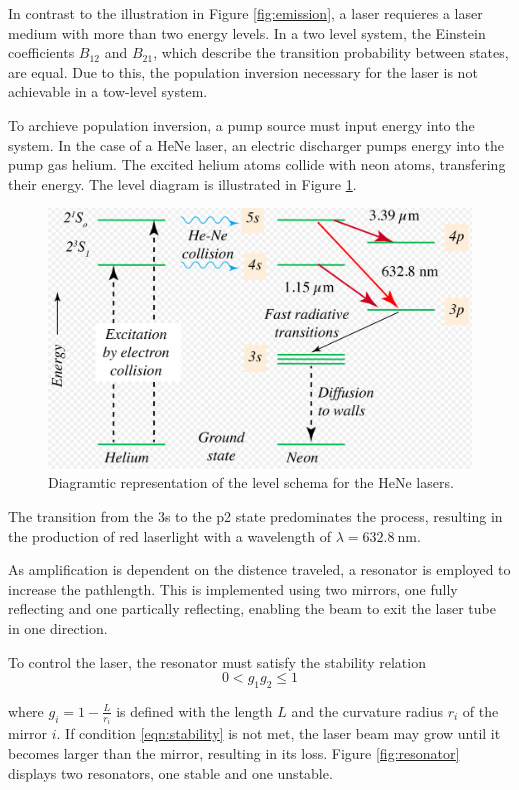 In contrast to the illustration in Figure \ref{fig:emission}, a laser 
requieres a laser medium with more than two energy levels. In a two 
level system, the Einstein coefficients $B_{12}$ and $B_{21}$, which 
describe the transition probability between states, are equal. Due to 
this, the population inversion necessary for the laser is not achievable
in a tow-level system.

To archieve population inversion, a pump source must input energy 
into the system. In the case of a HeNe laser, an electric discharger 
pumps energy into the pump gas helium. The excited helium atoms 
collide with neon atoms, transfering their energy. The level diagram is 
illustrated in Figure \ref{fig:level}.

\begin{figure}
    \centering
    \includegraphics[width=0.7\linewidth]{pictures/level.png} %
    \caption{Diagramtic representation of the level schema for the HeNe lasers. \cite{Wikipedia}}
    \label{fig:level}
\end{figure}
The transition from the 3s to the p2 state predominates the process, 
resulting in the production of red laserlight with a wavelength of 
$\lambda = \SI{632.8}{\nano\meter}$.

As amplification is dependent on the distence traveled, a resonator is 
employed to increase the pathlength. This is implemented using two 
mirrors, one fully reflecting and one partically reflecting, enabling
the beam to exit the laser tube in one direction.

To control the laser, the resonator must satisfy the stability relation
\begin{equation}
    0 < g_1g_2 \leq 1
    \label{eqn:stability}
\end{equation}

where $g_i=1-\frac{L}{r_i}$ is defined with the length $L$ and the 
curvature radius $r_i$ of the mirror $i$. If condition \eqref{eqn:stability}
is not met, the laser beam may grow until it becomes larger than the mirror,
resulting in its loss. Figure \ref{fig:resonator} displays two resonators,
one stable and one unstable.

